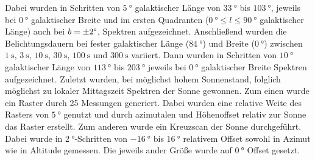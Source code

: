 Dabei wurden in Schritten von $\SI{5}{\degree}$ galaktischer Länge von $\SI{33}{\degree}$ bis $\SI{103}{\degree}$, jeweils bei $\SI{0}{\degree}$ galaktischer Breite und im ersten Quadranten ($\SI{0}{\degree} \le l \le \SI{90}{\degree}$ galaktischer Länge) auch bei $b=\pm \si{2}{\degree}$, Spektren aufgezeichnet.
Anschließend wurden die Belichtungsdauern bei fester galaktischer Länge ($\SI{84}{\degree}$) und Breite ($\SI{0}{\degree}$) zwischen $\SI{1}{\second}$, $\SI{3}{\second}$, $\SI{10}{\second}$, $\SI{30}{\second}$, $\SI{100}{\second}$ und $\SI{300}{\second}$ variiert.
Dann wurden in Schritten von $\SI{10}{\degree}$ galaktischer Länge von $\SI{113}{\degree}$ bis $\SI{203}{\degree}$ jeweils bei $\SI{0}{\degree}$ galaktischer Breite Spektren aufgezeichnet.
Zuletzt wurden, bei möglichst hohem Sonnenstand, folglich möglichst zu lokaler Mittagszeit Spektren der Sonne gewonnen.
Zum einen wurde ein Raster durch 25 Messungen generiert.
Dabei wurden eine relative Weite des Rasters von $\SI{5}{\degree}$ genutzt und durch azimutalen und Höhenoffset relativ zur Sonne das Raster erstellt.
Zum anderen wurde ein Kreuzscan der Sonne durchgeführt.
Dabei wurde in $\SI{2}{\degree}$-Schritten von $\SI{-16}{\degree}$ bis $\SI{16}{\degree}$ relativem Offset sowohl in Azimut wie in Altitude gemessen. Die jeweils ander Größe wurde auf $\SI{0}{\degree}$ Offset gesetzt.
